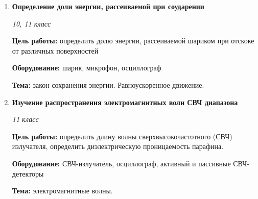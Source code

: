 \documentclass[a4paper,10pt]{article}
\newcommand{\labtitle}[5]{
	\textbf{#2}\par
	\textit{#1 класс}\par
	\textbf{Цель работы:} #3\par
	\textbf{Оборудование:} #4\par
	\textbf{Тема:} #5
}
\begin{document}
\begin{enumerate}
		{11}
		{Измерение постоянной Планка $\hbar$}
		{изучить явление фотоэффекта. Построить зависимость фототока от напряжения на аноде, построить зависимость запирающего напряжения от частоты света. Определить значение постоянной Планка.}
		{источник белого света, набор светофильтров, фотоэлемент, установка для измерения фототока при различных анодных напряжениях}
		{основы квантовой теории света. Фотоэффект}
	\item \labtitle
		{10, 11}
		{Определение доли энергии, рассеиваемой при соударении}
		{определить долю энергии, рассеиваемой шариком при отскоке от различных поверхностей}
		{шарик, микрофон, осциллограф}
		{закон сохранения энергии. Равноускоренное движение.}
	\item \labtitle
		{11}
		{Изучение распространения электромагнитных волн СВЧ диапазона}
		{определить длину волны сверхвысокочастотного (СВЧ) излучателя, определить диэлектрическую проницаемость парафина.}
		{СВЧ-излучатель, осциллограф, активный и пассивные СВЧ-детекторы}
		{электромагнитные волны.}

\end{enumerate}
\end{document}
